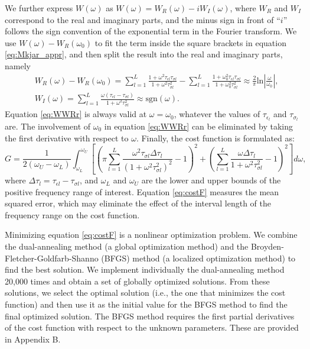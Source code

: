 \documentclass[article]{./macros/elsarticle_qh}
\begin{document}
We further express $W(\omega)$ as $W(\omega) = W_{R}(\omega) - i W_{I}(\omega)$, where $W_{R}$ and $W_{I}$ correspond to the real and imaginary parts, and the minus sign in front of ``$i$'' follows the sign convention of the exponential term in the Fourier transform.  
We use $W(\omega)-W_{R}(\omega_{0})$ to fit the term inside the square brackets in equation \ref{eq:Mkjar_appr}, and then split the result into the real and imaginary parts, namely
\begin{align}
\label{eq:WWRr}
& W_{R}(\omega) - W_{R}(\omega_{0}) = 
\sum_{l=1}^{L}
\frac{1 + \omega^2 \tau_{\epsilon l}\tau_{\sigma l}}
{1+\omega^2 \tau_{\sigma l}^2} 
-
\sum_{l=1}^{L}
\frac{1 + \omega_{0}^2 \tau_{\epsilon l}\tau_{\sigma l}}
{1+\omega_{0}^2 \tau_{\sigma l}^2} 
\approx
\frac{2}{\pi} \text{ln}\left|\frac{\omega}{\omega_{0}}\right| , \\
\label{eq:WWRi}
& W_{I}(\omega) = 
\sum_{l=1}^{L}
\frac{\omega (\tau_{\epsilon l}-\tau_{\sigma l})}{1+\omega^2 \tau_{\sigma l}^2} \approx \text{sgn}(\omega) .
\end{align}
Equation \ref{eq:WWRr} is always valid at $\omega = \omega_{0}$, whatever the values of $\tau_{\epsilon_l}$ and $\tau_{\sigma_l}$ are. The involvement of $\omega_{0}$ in equation \ref{eq:WWRr} can be eliminated by taking the first derivative with respect to $\omega$. Finally, the  cost function is formulated as:
\begin{equation} \label{eq:costF}
\displaystyle
G = \frac{1}{2(\omega_{U}-\omega_{L})} \int_{\omega_{L}}^{\omega_{U}} 
\left[
\left(\pi \sum_{l=1}^{L} \frac{\omega^2 \tau_{\sigma l} \Delta \tau_{l}}
{(1+\omega^2 \tau_{\sigma l}^2)^2} - 1 \right)^2 +
\left(
\sum_{l=1}^{L}
\frac{\omega \Delta \tau_{l}}{1+\omega^2 \tau_{\sigma l}^2} - 1
\right)^2 
\right]
d\omega ,
\end{equation}
where $\Delta \tau_{l}=\tau_{\epsilon l} - \tau_{\sigma l}$, and $\omega_{L}$ and $\omega_{U}$ are the lower and upper bounds of the positive frequency range of interest. Equation \ref{eq:costF} measures the mean squared error, which may eliminate the effect of the interval length of the frequency range on the cost function. 

Minimizing equation \ref{eq:costF} is a nonlinear optimization problem. 
We combine the dual-annealing method \citep[e.g.,][]{xiang:1997} (a global optimization method) and the Broyden-Fletcher-Goldfarb-Shanno (BFGS) method \citep[e.g.,][]{nocedal:2006} (a localized optimization method) to find the best solution. We implement individually the dual-annealing method 20,000 times and obtain a set of globally optimized solutions. From these solutions, we select the optimal solution (i.e., the one that minimizes the cost function) and then use it as the initial value for the BFGS method to find the final optimized solution. The BFGS method requires the first partial derivatives of the cost function with respect to the unknown parameters. These are provided in Appendix B.
\end{document}
